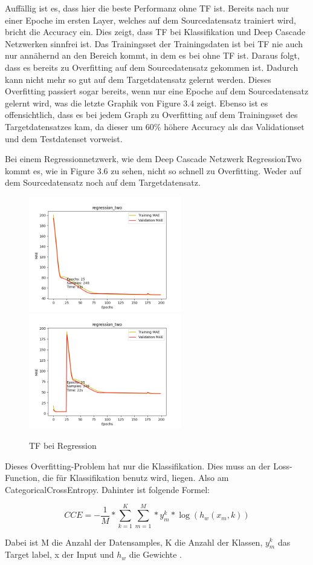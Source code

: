 Auffällig ist es, dass hier die beste Performanz ohne TF ist. Bereits nach nur einer Epoche im ersten Layer, welches auf dem Sourcedatensatz 
trainiert wird, bricht die Accuracy ein. Dies zeigt, dass TF bei Klassifikation und Deep Cascade Netzwerken sinnfrei ist. Das 
Trainingsset der Trainingsdaten ist bei TF nie auch nur annähernd an den Bereich kommt, in dem es bei ohne TF ist. Daraus folgt, dass es 
bereits zu Overfitting auf dem Sourcedatensatz gekommen ist. Dadurch kann nicht mehr so gut auf dem Targetdatensatz gelernt werden. Dieses 
Overfitting passiert sogar bereits, wenn nur eine Epoche auf dem Sourcedatensatz gelernt wird, was die letzte Graphik von Figure 3.4 zeigt. 
Ebenso ist es offensichtlich, dass es bei jedem Graph zu Overfitting auf dem Trainingsset des Targetdatensatzes kam, da dieser um 60\% höhere 
Accuracy als das Validationset und dem Testdatenset vorweist. 

Bei einem Regressionnetzwerk, wie dem Deep Cascade Netzwerk RegressionTwo kommt es, wie in Figure 3.6 zu sehen, nicht so schnell zu Overfitting. 
Weder auf dem Sourcedatensatz noch auf dem Targetdatensatz. 

\begin{figure}[htpb]
    \includegraphics[height=5cm]{../../Plots/ba_plots/regr2/woregr2tr.png}
    \includegraphics[height=5cm]{../../Plots/ba_plots/regr2/1TFtr.png}
    \caption{\label{fig:regr2tf} TF bei Regression}
\end{figure}

Dieses Overfitting-Problem hat nur die Klassifikation. Dies muss an der Loss-Function, die für Klassifikation benutz wird, liegen. Also 
am CategoricalCrossEntropy. Dahinter ist folgende Formel: 

\begin{equation}
    CCE = -\frac{1}{M}*\sum_{k=1}^{K}\sum_{m=1}^{M}*y_m^k * \log(h_w(x_m, k))
\end{equation} 

Dabei ist M die Anzahl der Datensamples, K die Anzahl der Klassen, $y_m^k$ das Target label, x der Input und $h_w$ die 
Gewichte \cite{rwcrossentropy}.

